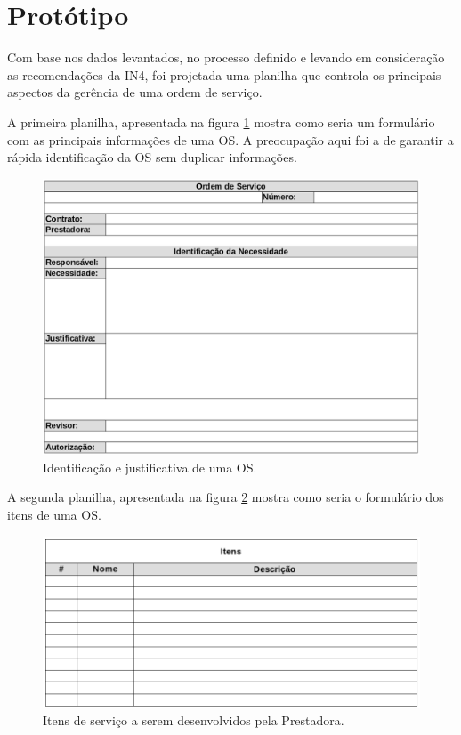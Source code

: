 \section{Protótipo}

Com base nos dados levantados, no processo definido e levando em consideração
as recomendações da IN4, foi projetada uma planilha que controla os principais
aspectos da gerência de uma ordem de serviço.

A primeira planilha, apresentada na figura \ref{fig:prot_geral} mostra como
seria um formulário com as principais informações de uma OS. A preocupação aqui
foi a de garantir a rápida identificação da OS sem duplicar informações.

\begin{figure}[H]
  \centering
  \includegraphics[keepaspectratio=true,scale=0.4]{figures/prot_geral}
  \caption{Identificação e justificativa de uma OS.}
  \label{fig:prot_geral}
\end{figure}

A segunda planilha, apresentada na figura \ref{fig:prot_itens} mostra como seria
o formulário dos itens de uma OS.

\begin{figure}[H]
  \centering
  \includegraphics[keepaspectratio=true,scale=0.5]{figures/prot_itens}
  \caption{Itens de serviço a serem desenvolvidos pela Prestadora.}
  \label{fig:prot_itens}
\end{figure}

